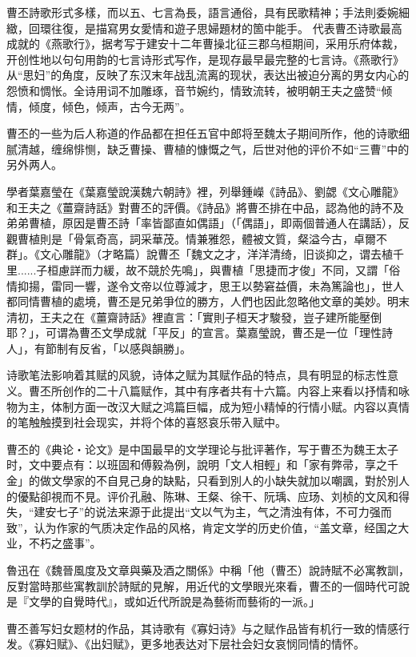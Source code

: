 曹丕詩歌形式多樣，而以五、七言為長，語言通俗，具有民歌精神；手法則委婉細緻，回環往復，是描寫男女愛情和遊子思婦題材的箇中能手。 代表曹丕诗歌最高成就的《燕歌行》，据考写于建安十二年曹操北征三郡乌桓期间，采用乐府体裁，开创性地以句句用韵的七言诗形式写作，是现存最早最完整的七言诗。《燕歌行》从“思妇”的角度，反映了东汉末年战乱流离的现状，表达出被迫分离的男女内心的怨愤和惆怅。全诗用词不加雕琢，音节婉约，情致流转，被明朝王夫之盛赞“倾情，倾度，倾色，倾声，古今无两”。

曹丕的一些为后人称道的作品都在担任五官中郎将至魏太子期间所作，他的诗歌细腻清越，缠绵悱恻，缺乏曹操、曹植的慷慨之气，后世对他的评价不如“三曹”中的另外两人。

學者葉嘉瑩在《葉嘉瑩說漢魏六朝詩》裡，列舉鍾嶸《詩品》、劉勰《文心雕龍》和王夫之《薑齋詩話》對曹丕的評價。《詩品》將曹丕排在中品，認為他的詩不及弟弟曹植，原因是曹丕詩「率皆鄙直如偶語」（「偶語」，即兩個普通人在講話），反觀曹植則是「骨氣奇高，詞采華茂。情兼雅怨，體被文質，粲溢今古，卓爾不群」。《文心雕龍》（才略篇）說曹丕「魏文之才，洋洋清绮，旧谈抑之，谓去植千里......子桓慮詳而力緩，故不競於先鳴」，與曹植「思捷而才俊」不同，又謂「俗情抑揚，雷同一響，遂令文帝以位尊減才，思王以勢窘益價，未為篤論也」，世人都同情曹植的處境，曹丕是兄弟爭位的勝方，人們也因此忽略他文章的美妙。明末清初，王夫之在《薑齋詩話》裡直言：「實則子桓天才駿發，豈子建所能壓倒耶？」，可谓為曹丕文學成就「平反」的宣言。葉嘉瑩說，曹丕是一位「理性詩人」，有節制有反省，「以感與韻勝」。

诗歌笔法影响着其赋的风貌，诗体之赋为其赋作品的特点，具有明显的标志性意义。曹丕所创作的二十八篇赋作，其中有序者共有十六篇。内容上来看以抒情和咏物为主，体制方面一改汉大赋之鸿篇巨幅，成为短小精悼的行情小赋。内容以真情的笔触触摸到社会现实，并将个体的喜怒哀乐带入赋中。

曹丕的《典论‧论文》是中国最早的文学理论与批评著作，写于曹丕为魏王太子时，文中要点有：以班固和傅毅為例，說明「文人相輕」和「家有弊帚，享之千金」的做文學家的不自見己身的缺點，只看到別人的小缺失就加以嘲諷，對於別人的優點卻視而不見。评价孔融、陈琳、王粲、徐干、阮瑀、应玚、刘桢的文风和得失，“建安七子”的说法来源于此提出“文以气为主，气之清浊有体，不可力强而致”，认为作家的气质决定作品的风格，肯定文学的历史价值，“盖文章，经国之大业，不朽之盛事”。

魯迅在《魏晉風度及文章與藥及酒之關係》中稱「他（曹丕）說詩賦不必寓教訓，反對當時那些寓教訓於詩賦的見解，用近代的文學眼光來看，曹丕的一個時代可說是『文學的自覺時代』，或如近代所說是為藝術而藝術的一派。」

曹丕善写妇女题材的作品，其诗歌有《寡妇诗》与之赋作品皆有机行一致的情感行发。《寡妇赋》、《出妇赋》，更多地表达对下层社会妇女哀悯同情的情怀。

